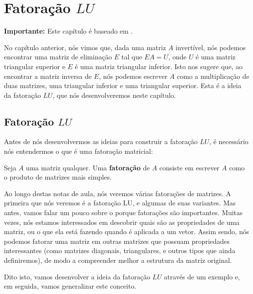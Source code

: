 \chapter{Fatoração \texorpdfstring{$LU$}{LU}}
\label{cap:fatoração-lu}

\textbf{Importante:} Este capítulo é baseado em \cite{slide3doyuri}.

No capítulo anterior, nós vimos que, dada uma matriz $A$ invertível, nós podemos encontrar uma matriz de eliminação $E$ tal que $EA = U$, onde $U$ é uma matriz triangular superior e $E$ é uma matriz triangular inferior. Isto nos sugere que, ao encontrar a matriz inversa de $E$, nós podemos escrever $A$ como a multiplicação de duas matrizes, uma triangular inferior e uma triangular superior. Esta é a ideia da fatoração $LU$, que nós desenvolveremos neste capítulo.

\section{Fatoração \texorpdfstring{$LU$}{LU}}

Antes de nós desenvolvermos as ideias para construir a fatoração $LU$, é necessário nós entendermos o que é uma fatoração matricial:

\begin{Definition}[Fatoração]
	Seja $A$ uma matriz qualquer. Uma \textbf{fatoração} de $A$ consiste em escrever $A$ como o produto de matrizes mais simples.
\end{Definition}

Ao longo destas notas de aula, nós veremos várias fatorações de matrizes. A primeira que nós veremos é a fatoração LU, e algumas de suas variantes. Mas antes, vamos falar um pouco sobre o porque fatorações são importantes. Muitas vezes, nós estamos interessados em descobrir quais são as propriedades de uma matriz, ou o que ela está fazendo quando é aplicada a um vetor. Assim sendo, nós podemos fatorar uma matriz em outras matrizes que possuam propriedades interessantes (como matrizes diagonais, triangulares, e outros tipos que ainda definiremos), de modo a compreender melhor a estrutura da matriz original.

Dito isto, vamos desenvolver a ideia da fatoração $LU$ através de um exemplo e, em seguida, vamos generalizar este conceito.

